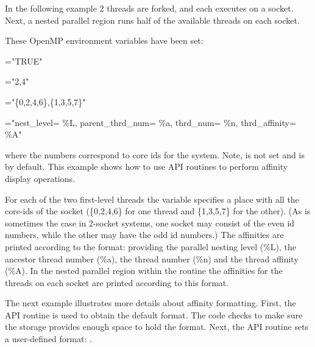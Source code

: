 


In the following example 2 threads are forked, and each executes on a socket. Next,
a nested parallel region runs half of the available threads on each socket.

These OpenMP environment variables have been set:

\begin{compactitem}
\item {}="TRUE"
\item {}="2,4"
\item {}="\{0,2,4,6\},\{1,3,5,7\}"
\item {}="nest\_level= \%L, parent\_thrd\_num= \%a, thrd\_num= \%n, thrd\_affinity= \%A"
\end{compactitem}

where the numbers correspond to core ids for the system. Note,  is not
set and is  by default.  This example shows how to use API routines to
perform affinity display operations.

For each of the two first-level threads the  variable specifies
a place with all the core-ids of the socket (\{0,2,4,6\} for one thread and \{1,3,5,7\} for the other).
(As is sometimes the case in 2-socket systems, one socket may consist
of the even id numbers, while the other may have the odd id numbers.)  The affinities
are printed according to the  format: providing
the parallel nesting level (\%L), the ancestor thread number (\%a), the thread number (\%n)
and the thread affinity (\%A). In the nested parallel region within the  routine
the affinities for the threads on each socket are printed according to this format.



The next example illustrates more details about affinity formatting.
First, the  API routine is used to 
obtain the default format. The code checks to make sure the storage 
provides enough space to hold the format.  
Next, the  API routine sets a user-defined 
format: .   

